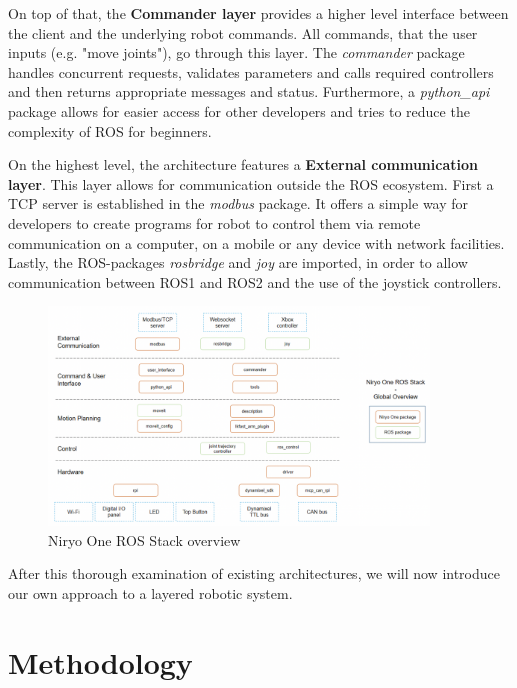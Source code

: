 \documentclass[]{article}
\begin{document}
	On top of that, the \textbf{Commander layer} provides a higher level interface between the client and the underlying robot commands. All commands, that the user inputs (e.g. "move joints"), go through this layer. The \textit{commander} package handles concurrent requests, validates parameters and calls required controllers and then returns appropriate messages and status. 
	Furthermore, a \textit{python\_api} package allows for easier access for other developers and tries to reduce the complexity of ROS for beginners. \autocite{roboticsGetStartedNiryo2024,roboticsNiryoOneROS2024}
	
	On the highest level, the architecture features a \textbf{External communication layer}.  This layer allows for communication outside the ROS ecosystem. First a TCP server is established in the \textit{modbus} package. It offers a simple way for developers to create programs for robot to control them via remote communication on a computer, on a mobile or any device with network facilities. Lastly, the ROS-packages \textit{rosbridge} and \textit{joy} are imported, in order to allow communication between ROS1 and ROS2 and the use of the joystick controllers. \autocite{roboticsGetStartedNiryo2024,roboticsNiryoOneROS2024}
	
	
	\begin{figure}[ht]
		\centering
		\includegraphics[width=0.9\textwidth]{Graphics/Niryo}
		\caption{Niryo One ROS Stack overview \autocite{roboticsNiryoOneROS2024}}
		\label{fig: fig6}
	\end{figure}
	
	After this thorough examination of existing architectures, we will now introduce our own approach to a layered robotic system. 
	\newpage
	
	\section{Methodology}
\end{document}
